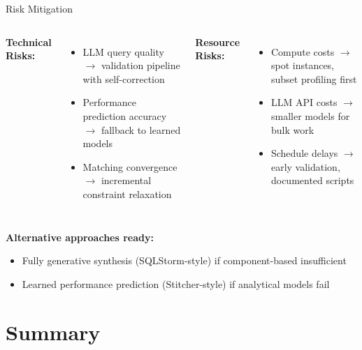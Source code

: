 \documentclass[aspectratio=169]{beamer}
\begin{document}
\begin{frame}{Risk Mitigation}
    \begin{columns}
        \textbf{Technical Risks:}
        \begin{itemize}
            \item LLM query quality $\rightarrow$ validation pipeline with self-correction
            \item Performance prediction accuracy $\rightarrow$ fallback to learned models
            \item Matching convergence $\rightarrow$ incremental constraint relaxation
        \end{itemize}
        
        \textbf{Resource Risks:}
        \begin{itemize}
            \item Compute costs $\rightarrow$ spot instances, subset profiling first
            \item LLM API costs $\rightarrow$ smaller models for bulk work
            \item Schedule delays $\rightarrow$ early validation, documented scripts
        \end{itemize}
    \end{columns}
    
    \vspace{0.5cm}
    \textbf{Alternative approaches ready:}
    \begin{itemize}
        \item Fully generative synthesis (SQLStorm-style) if component-based insufficient
        \item Learned performance prediction (Stitcher-style) if analytical models fail
    \end{itemize}
\end{frame}

\section{Summary}
\end{document}
